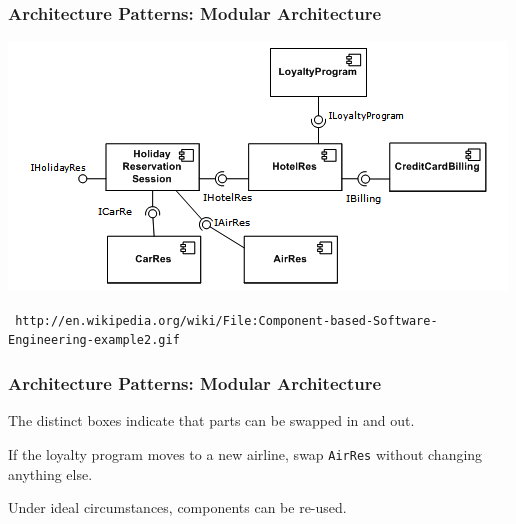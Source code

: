 \begin{frame}
\frametitle{Architecture Patterns: Modular Architecture}
\begin{center}
	\includegraphics[width=\textwidth]{images/cbse.png}
	
	\texttt{\tiny
http://en.wikipedia.org/wiki/File:Component-based-Software-Engineering-example2.gif}
\end{center}
\end{frame}

\begin{frame}
\frametitle{Architecture Patterns: Modular Architecture}

\begin{changemargin}{1cm}
The distinct boxes indicate that parts can be swapped in and out.

If the loyalty program moves to a new airline, swap \texttt{AirRes} without changing anything else.

Under ideal circumstances, components can be re-used. 
\end{changemargin}
\end{frame}



